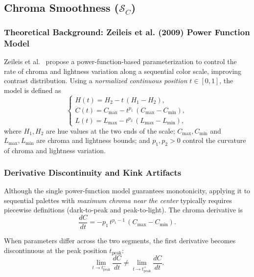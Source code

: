 \subsection{Chroma Smoothness ($\mathcal{S}_C$)}
\label{subsec:chroma-smoothness}

\subsubsection{Theoretical Background: Zeileis et al. (2009) Power Function Model~\cite{zeileis2009}}

Zeileis et al.~\cite{zeileis2009} propose a power-function-based parameterization to control the rate of chroma
and lightness variation along a sequential color scale, improving contrast distribution.
Using a \emph{normalized continuous position} $t \in [0,1]$, the model is defined as
\begin{equation}
\begin{cases}
H(t) = H_2 - t\,(H_1 - H_2), \\
C(t) = C_{\max} - t^{p_1}\,(C_{\max} - C_{\min}), \\
L(t) = L_{\max} - t^{p_2}\,(L_{\max} - L_{\min}),
\end{cases}
\end{equation}
where $H_1, H_2$ are hue values at the two ends of the scale;
$C_{\max}, C_{\min}$ and $L_{\max}, L_{\min}$ are chroma and lightness bounds; and
$p_1, p_2 > 0$ control the curvature of chroma and lightness variation.

\subsubsection{Derivative Discontinuity and Kink Artifacts}

Although the single power-function model guarantees monotonicity, applying it to sequential
palettes with \emph{maximum chroma near the center} typically requires piecewise definitions
(dark-to-peak and peak-to-light). The chroma derivative is
\begin{equation}
\frac{dC}{dt}
=
- p_1\, t^{p_1-1}\,(C_{\max} - C_{\min}).
\end{equation}

When parameters differ across the two segments, the first derivative becomes discontinuous at
the peak position $t_{\mathrm{peak}}$:
\begin{equation}
\lim_{t \to t_{\mathrm{peak}}^-} \frac{dC}{dt}
\neq
\lim_{t \to t_{\mathrm{peak}}^+} \frac{dC}{dt}.
\end{equation}

